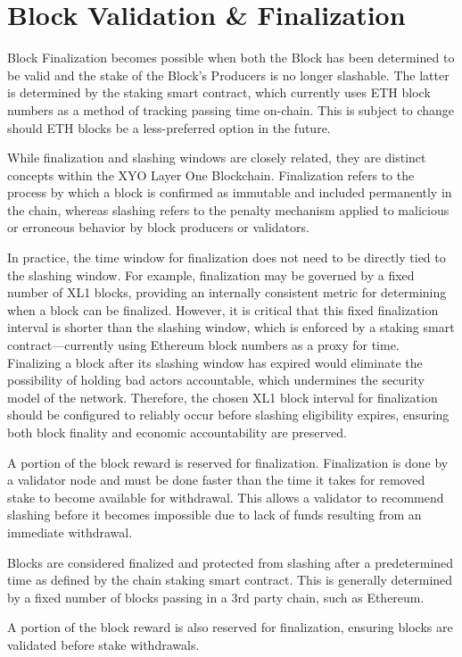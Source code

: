 \documentclass{article}
\begin{document}
\section{Block Validation \& Finalization}
Block Finalization becomes possible when both the Block has been determined to be valid and the stake of the Block's Producers is no longer slashable. The latter is determined by the staking smart contract, which currently uses ETH block numbers as a method of tracking passing time on-chain. This is subject to change should ETH blocks be a less-preferred option in the future.

While finalization and slashing windows are closely related, they are distinct concepts within the XYO Layer One Blockchain. Finalization refers to the process by which a block is confirmed as immutable and included permanently in the chain, whereas slashing refers to the penalty mechanism applied to malicious or erroneous behavior by block producers or validators.

In practice, the time window for finalization does not need to be directly tied to the slashing window. For example, finalization may be governed by a fixed number of XL1 blocks, providing an internally consistent metric for determining when a block can be finalized. However, it is critical that this fixed finalization interval is shorter than the slashing window, which is enforced by a staking smart contract—currently using Ethereum block numbers as a proxy for time. Finalizing a block after its slashing window has expired would eliminate the possibility of holding bad actors accountable, which undermines the security model of the network. Therefore, the chosen XL1 block interval for finalization should be configured to reliably occur before slashing eligibility expires, ensuring both block finality and economic accountability are preserved.

A portion of the block reward is reserved for finalization. Finalization is done by a validator node and must be done faster than the time it takes for removed stake to become available for withdrawal. This allows a validator to recommend slashing before it becomes impossible due to lack of funds resulting from an immediate withdrawal. 

Blocks are considered finalized and protected from slashing after a predetermined time as defined by the chain staking smart contract. This is generally determined by a fixed number of blocks passing in a 3rd party chain, such as Ethereum.

A portion of the block reward is also reserved for finalization, ensuring blocks are validated before stake withdrawals. 
\end{document}
